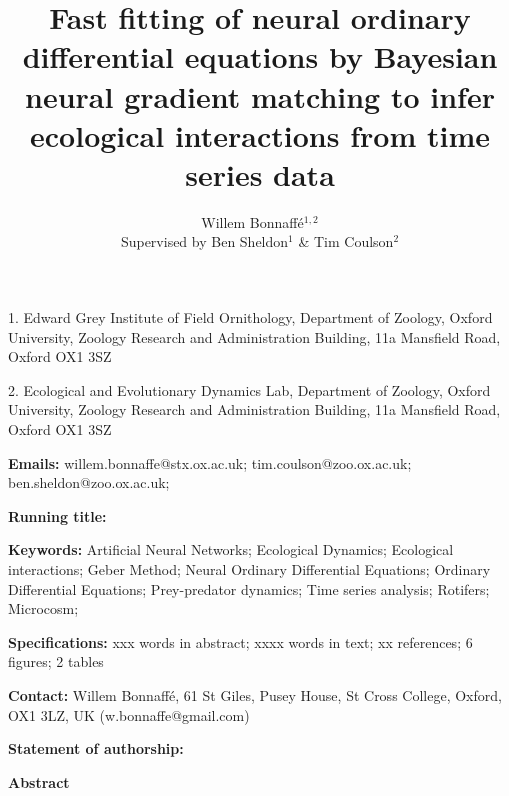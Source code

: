 \documentclass[11pt, oneside]{article}
\title{Fast fitting of neural ordinary differential equations by Bayesian neural gradient matching to infer ecological interactions from time series data}
\author{Willem Bonnaff\'e$^{1,2}$\\ Supervised by Ben Sheldon$^1$ \& Tim Coulson$^2$}
\date{}
\begin{document}
\maketitle
{}

1. Edward Grey Institute of Field Ornithology, Department of Zoology, Oxford University, Zoology Research and Administration Building, 11a Mansfield Road, Oxford OX1 3SZ 

2. Ecological and Evolutionary Dynamics Lab, Department of Zoology, Oxford University, Zoology Research and Administration Building, 11a Mansfield Road, Oxford OX1 3SZ 

\textbf{Emails:}
willem.bonnaffe@stx.ox.ac.uk;
tim.coulson@zoo.ox.ac.uk;
ben.sheldon@zoo.ox.ac.uk;

\textbf{Running title:}

\textbf{Keywords:}
Artificial Neural Networks;
Ecological Dynamics;  
Ecological interactions;
Geber Method; 
Neural Ordinary Differential Equations; 
Ordinary Differential Equations; 
Prey-predator dynamics; 
Time series analysis;
Rotifers;
Microcosm;


\textbf{Specifications:}  xxx words in abstract; xxxx words in text; xx references; 6 figures; 2 tables

\textbf{Contact:}
Willem Bonnaff\'e, 61 St Giles, Pusey House, St Cross College, Oxford, OX1 3LZ, UK (w.bonnaffe@gmail.com)

\textbf{Statement of authorship:}


\newpage
{}

\textbf{Abstract} 
\end{document}
